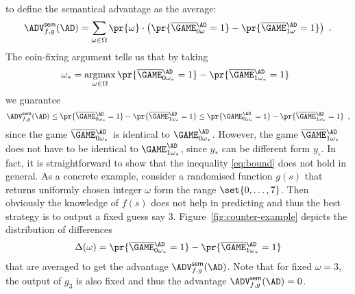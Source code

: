 \documentclass{crypto-exercise}
\begin{document}
\begin{solution}
\begin{align*}
\end{align*}
to define the semantical advantage as the average: 
\begin{align*}
\advSemXX{f,g}{\AD}=%
\sum_{\omega\in\Omega}\pr{\omega}\cdot\bigl(\pr{\smash{\smash{\overline{\GAME}}_{0\omega}^\AD=1}}-\pr{\smash{\smash{\overline{\GAME}}_{1\omega}^\AD=1}}\bigr)\enspace.
\end{align*}
The coin-fixing argument tells us that by taking
\begin{align*}
\omega_*=\argmax_{\omega\in\Omega} \pr{\smash{\smash{\overline{\GAME}}_{0\omega_*}^\AD=1}}-\pr{\smash{\smash{\overline{\GAME}}_{1\omega_*}^\AD=1}}\enspace
\end{align*} 
we guarantee
\begin{align*}
\advSemXX{f,g}{\AD}\leq \pr{\smash{\smash{\overline{\GAME}}_{0\omega_*}^\AD=1}}-\pr{\smash{\smash{\overline{\GAME}}_{1\omega_*}^\AD=1}}\leq
\pr{\smash{\GAME_{0\omega_*}^\AD=1}}-\pr{\smash{\smash{\overline{\GAME}}_{1\omega_*}^\AD=1}}
\enspace,
\end{align*}
since the game $\smash{\overline{\GAME}}_{0\omega_*}^\AD$ is identical to $\GAME_{0\omega_*}^\AD$. However, the game $\smash{\overline{\GAME}}_{1\omega_*}^\AD$ does not have to be identical to $\GAME_{1\omega_*}^\AD$, since $y_*$ can be different form $y_\circ$. In fact, it is straightforward to show that the inequality \eqref{eq:bound} does not hold in general. As a concrete example, consider a randomised function $g(s)$ that returns uniformly chosen integer $\omega$ form the range $\set{0,\ldots,7}$. Then obviously the knowledge of $f(s)$ does not help in predicting and thus the best strategy is to output a fixed guess say $3$. Figure~\ref{fig:counter-example} depicts the distribution of differences 
\begin{align*}
\Delta(\omega)=\pr{\smash{\smash{\overline{\GAME}}_{0\omega_*}^\AD=1}}-\pr{\smash{\smash{\overline{\GAME}}_{1\omega_*}^\AD=1}}
\end{align*}
that are averaged to get the advantage $\advSemXX{f,g}{\AD}$. Note that for fixed $\omega=3$, the output of $g_3$ is also fixed and thus the advantage $\advSemXX{f,g}{\AD}=0$. 

\begin{figure}[!h]
\begin{center}
\end{center}
\end{figure}
\end{solution}
\end{document}
